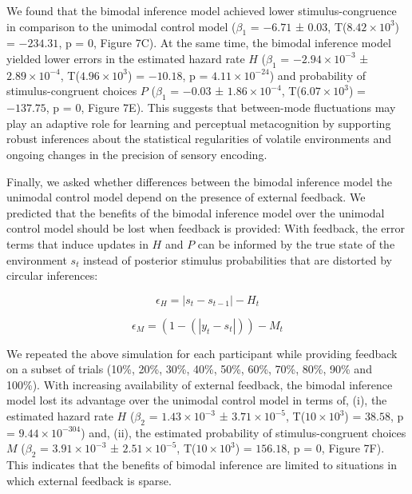 \documentclass[
]{article}
\begin{document}
We found that the bimodal inference model achieved lower
stimulus-congruence in comparison to the unimodal control model
(\(\beta_1\) = \(-6.71\) ± \(0.03\),
T(\(\ensuremath{8.42\times 10^{3}}\)) = \(-234.31\), p = \(0\), Figure
7C). At the same time, the bimodal inference model yielded lower errors
in the estimated hazard rate \(H\) (\(\beta_1\) =
\(\ensuremath{-2.94\times 10^{-3}}\) ±
\(\ensuremath{2.89\times 10^{-4}}\),
T(\(\ensuremath{4.96\times 10^{3}}\)) = \(-10.18\), p =
\(\ensuremath{4.11\times 10^{-24}}\)) and probability of
stimulus-congruent choices \(P\) (\(\beta_1\) = \(-0.03\) ±
\(\ensuremath{1.86\times 10^{-4}}\),
T(\(\ensuremath{6.07\times 10^{3}}\)) = \(-137.75\), p = \(0\), Figure
7E). This suggests that between-mode fluctuations may play an adaptive
role for learning and perceptual metacognition by supporting robust
inferences about the statistical regularities of volatile environments
and ongoing changes in the precision of sensory encoding.

Finally, we asked whether differences between the bimodal inference
model the unimodal control model depend on the presence of external
feedback. We predicted that the benefits of the bimodal inference model
over the unimodal control model should be lost when feedback is
provided: With feedback, the error terms that induce updates in \(H\)
and \(P\) can be informed by the true state of the environment \(s_t\)
instead of posterior stimulus probabilities that are distorted by
circular inferences:

\begin{equation}
\epsilon_H = |s_t - s_{t-1}| - H_t
\end{equation}

\begin{equation}
\epsilon_M = (1- (|y_t - s_t|)) - M_t
\end{equation}

We repeated the above simulation for each participant while providing
feedback on a subset of trials (10\%, 20\%, 30\%, 40\%, 50\%, 60\%,
70\%, 80\%, 90\% and 100\%). With increasing availability of external
feedback, the bimodal inference model lost its advantage over the
unimodal control model in terms of, (i), the estimated hazard rate \(H\)
(\(\beta_2\) = \(\ensuremath{1.43\times 10^{-3}}\) ±
\(\ensuremath{3.71\times 10^{-5}}\), T(\(\ensuremath{10\times 10^{3}}\))
= \(38.58\), p = \(\ensuremath{9.44\times 10^{-304}}\)) and, (ii), the
estimated probability of stimulus-congruent choices \(M\) (\(\beta_2\) =
\(\ensuremath{3.91\times 10^{-3}}\) ±
\(\ensuremath{2.51\times 10^{-5}}\), T(\(\ensuremath{10\times 10^{3}}\))
= \(156.18\), p = \(0\), Figure 7F). This indicates that the benefits of
bimodal inference are limited to situations in which external feedback
is sparse.
\end{document}
